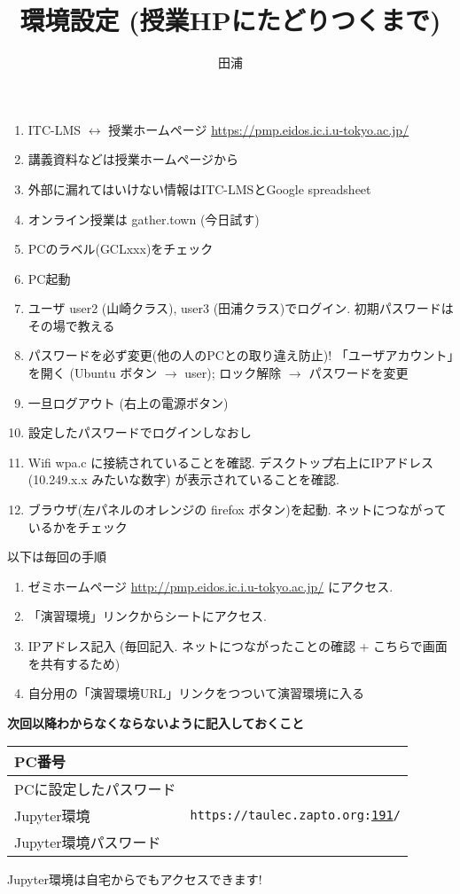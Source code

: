 \documentclass[12pt,dvipdfmx]{article}
\title{環境設定 (授業HPにたどりつくまで)}
\author{田浦}
\date{}
\begin{document}
\maketitle
\thispagestyle{empty}

\begin{enumerate}
\item ITC-LMS $\leftrightarrow$ 授業ホームページ \url{https://pmp.eidos.ic.i.u-tokyo.ac.jp/}
  
\item 講義資料などは授業ホームページから
\item 外部に漏れてはいけない情報はITC-LMSとGoogle spreadsheet
\item オンライン授業は gather.town (今日試す)
  
\item PCのラベル(GCLxxx)をチェック
\item PC起動
\item ユーザ user2 (山崎クラス), user3 (田浦クラス)でログイン. 
初期パスワードはその場で教える
\item パスワードを必ず変更(他の人のPCとの取り違え防止)! 
  「ユーザアカウント」を開く (Ubuntu ボタン $\rightarrow$ user);
  ロック解除 
  $\rightarrow$ パスワードを変更
\item 一旦ログアウト (右上の電源ボタン)
\item 設定したパスワードでログインしなおし
\item Wifi wpa.c に接続されていることを確認.
  デスクトップ右上にIPアドレス (10.249.x.x みたいな数字) 
  が表示されていることを確認.
\item ブラウザ(左パネルのオレンジの firefox ボタン)を起動.
  ネットにつながっているかをチェック
\end{enumerate}

以下は毎回の手順

\begin{enumerate}
\item ゼミホームページ \url{http://pmp.eidos.ic.i.u-tokyo.ac.jp/} にアクセス.
\item 「演習環境」リンクからシートにアクセス.
\item IPアドレス記入 (毎回記入. ネットにつながったことの確認 + こちらで画面を共有するため)
\item 自分用の「演習環境URL」リンクをつついて演習環境に入る
\end{enumerate}

{\huge{\bf 次回以降わからなくならないように記入しておくこと}}

\begin{center}
  {\Large
\begin{tabular}{|l|l|}\hline
  PC番号 &  \\\hline
  PCに設定したパスワード & \\\hline
  Jupyter環境 & {\tt https://taulec.zapto.org:\underline{191\phantom{0000}}/} \\\hline
  Jupyter環境パスワード & \\\hline
\end{tabular}}
\end{center}

Jupyter環境は自宅からでもアクセスできます!
\end{document}
